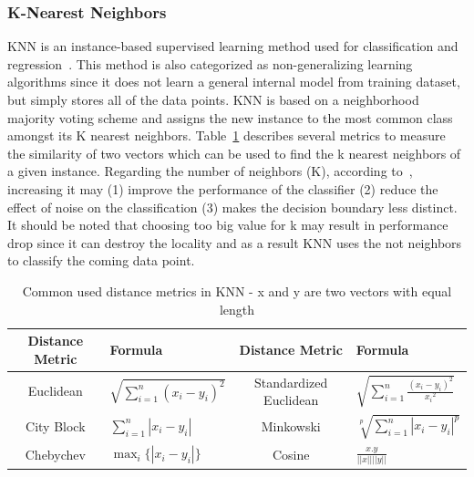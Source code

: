 \subsubsection{K-Nearest Neighbors} 
KNN is an instance-based supervised learning method used for classification and regression~\citep{cover1967nearest}. This method is also categorized as non-generalizing learning algorithms since it does not learn a general internal model from training dataset, but simply stores all of the data points. KNN is based on a neighborhood majority voting scheme and
assigns the new instance to the most common class amongst its K nearest neighbors. Table~\ref{tab:KNN_distances} describes several metrics to measure the similarity of two vectors which can be used to find the k nearest neighbors of a given instance. Regarding the number of neighbors (K), according to~\citep{doi:10.1002/9780470977811.ch8}, increasing it may (1) improve the performance of the classifier (2) reduce the effect of noise on the classification (3) makes the decision boundary less distinct. It should be noted that choosing too big value for k may result in performance drop since it can destroy the locality and as a result KNN uses the not neighbors to classify the coming data point. 


\begin{table}[h]
    \centering
\renewcommand{\arraystretch}{2.5}
\begin{tabular}{|c|>{\centering}m{4cm}|c|>{\centering}m{4cm}|}
\hline 
Distance Metric & Formula & Distance Metric & Formula  \tabularnewline
\hline 
\hline 
 Euclidean& $\sqrt{\sum_{i=1}^{n} {(x_i - y_i)}^{2}}$  & Standardized
Euclidean &  $\sqrt{\sum_{i=1}^{n} \frac{{(x_i - y_i)}^{2}}{{x_{i}}^2}}$ \tabularnewline
\hline 
 City Block & ${\sum_{i=1}^{n} {|x_i - y_i|}}$ & Minkowski & $\sqrt[p]{\sum_{i=1}^{n} {{|x_i - y_i|}}^{p}}$ \tabularnewline
\hline 
Chebychev & $\max_i \{|x_i - y_i|\}$  & Cosine & $\frac{x.y}{||x||||y||}$\tabularnewline
\hline 
\end{tabular}
\caption{Common used distance metrics in KNN - x and y are two vectors with equal length}
    \label{tab:KNN_distances}
\end{table}
\renewcommand{\arraystretch}{1}


